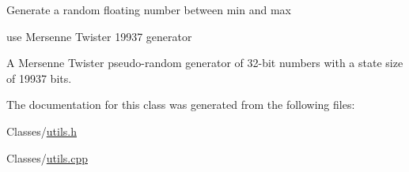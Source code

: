 Generate a random floating number between min and max

use Mersenne Twister 19937 generator

A Mersenne Twister pseudo-\/random generator of 32-\/bit numbers with a state size of 19937 bits. 

The documentation for this class was generated from the following files\+:\begin{DoxyCompactItemize}
\item 
Classes/\hyperlink{utils_8h}{utils.\+h}\item 
Classes/\hyperlink{utils_8cpp}{utils.\+cpp}\end{DoxyCompactItemize}
